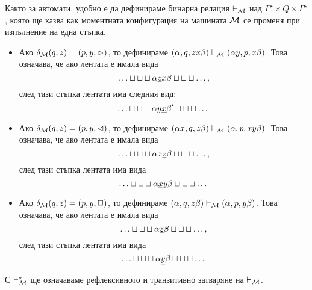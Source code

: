 Както за автомати, удобно е да дефинираме бинарна релация $\vdash_{\mathcal{M}}$ над $\Gamma^\star \times Q \times \Gamma^\star$,
която ще казва как моментната конфигурация на машината $\mathcal{M}$ се променя при изпълнение на една стъпка.
\begin{itemize}
\item
  Ако $\delta_{\mathcal{M}}(q,z) = (p,y,\rhd)$, то дефинираме $(\alpha, q, zx\beta) \vdash_{\mathcal{M}} (\alpha y, p, x\beta)$.
  Това означава, че ако лентата е имала вида 
  \[\tape{\alpha\underline{z}x\beta},\]
  след тази стъпка лентата има следния вид:
    \[\tape{\alpha y\underline{x}\beta'}\]
\item 
  Ако $\delta_{\mathcal{M}}(q,z) = (p,y,\lhd)$, то дефинираме $(\alpha x, q, z\beta) \vdash_{\mathcal{M}} (\alpha , p, xy\beta)$.
  Това означава, че ако лентата е имала вида 
  \[\tape{\alpha x\underline{z}\beta},\]
  след тази стъпка лентата има вида 
  \[\tape{\alpha \underline{x}y\beta}\]
\item
  Ако $\delta_{\mathcal{M}}(q, z) = (p, y, \Box)$, то дефинираме $(\alpha, q, z\beta) \vdash_{\mathcal{M}} (\alpha , p, y\beta)$.
  Това означава, че ако лентата е имала вида 
  \[\tape{\alpha \underline{z}\beta},\]
  след тази стъпка лентата има вида 
  \[\tape{\alpha \underline{y}\beta}\]
  
\end{itemize}
С $\vdash^\star_{\mathcal{M}}$ ще означаваме рефлексивното и транзитивно затваряне на $\vdash_{\mathcal{M}}$.

